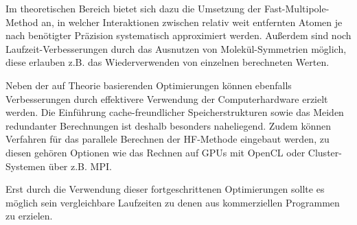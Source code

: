 Im theoretischen Bereich bietet sich dazu die Umsetzung der Fast-Multipole-Method \cite[9.14.3]{structure_2013} an,
in welcher Interaktionen zwischen relativ weit entfernten Atomen
je nach benötigter Präzision systematisch approximiert werden.
Außerdem sind noch Laufzeit-Verbesserungen durch das Ausnutzen von Molekül-Symmetrien möglich,
diese erlauben z.B. das Wiederverwenden von einzelnen berechneten Werten.

Neben der auf Theorie basierenden Optimierungen können ebenfalls Verbesserungen
durch effektivere Verwendung der Computerhardware erzielt werden.
Die Einführung cache-freundlicher Speicherstrukturen sowie das Meiden redundanter
Berechnungen ist deshalb besonders naheliegend.
Zudem können Verfahren für das parallele Berechnen der HF-Methode eingebaut werden,
zu diesen gehören Optionen wie das Rechnen auf GPUs mit OpenCL\cite{opencl}
oder Cluster-Systemen über z.B. MPI\cite{mpi}.

Erst durch die Verwendung dieser fortgeschrittenen Optimierungen sollte es möglich sein
vergleichbare Laufzeiten zu denen aus kommerziellen Programmen zu erzielen.
